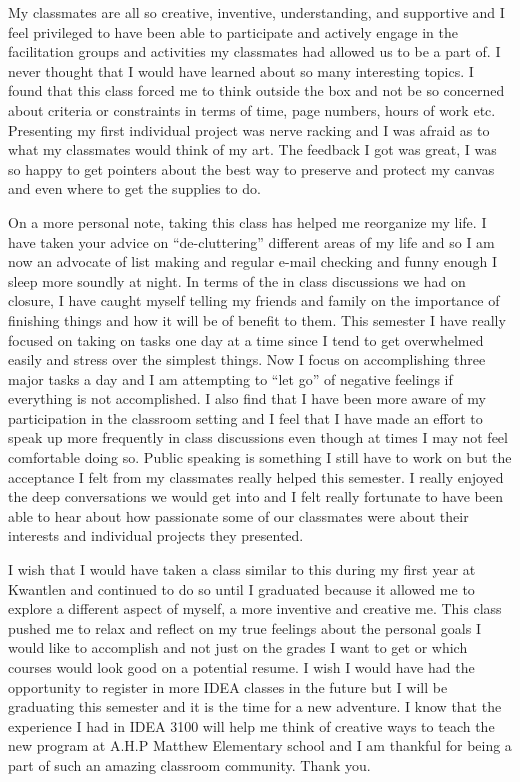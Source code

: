 \documentclass[letterpaper,10pt,headsepline]{scrreprt}
\begin{document}
My classmates are all so creative, inventive, understanding, and supportive and I feel privileged to have been able to participate and actively engage in the facilitation groups and activities my classmates had allowed us to be a part of. I never thought that I would have learned about so many interesting topics. I found that this class forced me to think outside the box and not be so concerned about criteria or constraints in terms of time, page numbers, hours of work etc. Presenting my first individual project was nerve racking and I was afraid as to what my classmates would think of my art. The feedback I got was great, I was so happy to get pointers about the best way to preserve and protect my canvas and even where to get the supplies to do.

On a more personal note, taking this class has helped me reorganize my life. I have taken your advice on “de-cluttering” different areas of my life and so I am now an advocate of list making and regular e-mail checking and funny enough I sleep more soundly at night. In terms of the in class discussions we had on closure, I have caught myself telling my friends and family on the importance of finishing things and how it will be of benefit to them. This semester I have really focused on taking on tasks one day at a time since I tend to get overwhelmed easily and stress over the simplest things. Now I focus on accomplishing three major tasks a day and I am attempting to “let go” of negative feelings if everything is not accomplished. I also find that I have been more aware of my participation in the classroom setting and I feel that I have made an effort to speak up more frequently in class discussions even though at times I may not feel comfortable doing so. Public speaking is something I still have to work on but the acceptance I felt from my classmates really helped this semester. I really enjoyed the deep conversations we would get into and I felt really fortunate to have been able to hear about how passionate some of our classmates were about their interests and individual projects they presented.

I wish that I would have taken a class similar to this during my first year at Kwantlen and continued to do so until I graduated because it allowed me to explore a different aspect of myself, a more inventive and creative me. This class pushed me to relax and reflect on my true feelings about the personal goals I would like to accomplish and not just on the grades I want to get or which courses would look good on a potential resume. I wish I would have had the opportunity to register in more IDEA classes in the future but I will be graduating this semester and it is the time for a new adventure. I know that the experience I had in IDEA 3100 will help me think of creative ways to teach the new program at A.H.P Matthew Elementary school and I am thankful for being a part of such an amazing classroom community. Thank you.
\end{document}
